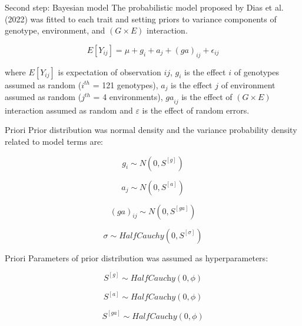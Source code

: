 \documentclass[
  ignorenonframetext,
  aspectratio=169,
]{beamer}
\begin{document}
\begin{frame}{Second step: Bayesian model}
\label{second-step-bayesian-model}
The probabilistic model proposed by Dias et al. (2022) was fitted to
each trait and setting priors to variance components of genotype,
environment, and \((G\times E)\) interaction.

\[
            E[{Y}_{ij}] = {\mu} + {g}_i + {a}_j + {(ga)}_{ij} + {\epsilon}_{ij}
\]

where \(E[{Y}_{ij}]\) is expectation of observation \(ij\), \({g}_{i}\)
is the effect \(i\) of genotypes assumed as random (\(i^{th}\) = 121
genotypes), \({a}_{j}\) is the effect \(j\) of environment assumed as
random (\(j^{th}\) = 4 environments), \({ga}_{ij}\) is the effect of
\((G\times E)\) interaction assumed as random and \({\varepsilon}\) is
the effect of random errors.
\end{frame}

\begin{frame}{Priori}
\label{priori}
Prior distribution was normal density and the variance probability
density related to model terms are:

\[{g}_i \sim N (0,{S}^{[g]})\]

\[{a}_j \sim N (0,{S}^{[a]})\]

\[{(ga)}_{ij} \sim N (0,{S}^{[ga]})\]

\[{\sigma} \sim HalfCauchy (0,{S}^{[\sigma]})\]
\end{frame}

\begin{frame}{Priori}
\label{priori-1}
Parameters of prior distribution was assumed as hyperparameters:

\[ {S}^{[{g}]} \sim \textit{HalfCauchy} (0,\phi) \]

\[ {S}^{[{a}]} \sim \textit{HalfCauchy} (0,\phi) \]

\[ {S}^{[{ga}]} \sim \textit{HalfCauchy} (0,\phi) \]
\end{frame}
\end{document}
